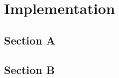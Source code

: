\chapter{Implementation}\label{ch:implementation} %
\lipsum[1]

\section{Section A}
\lipsum[4-8]

\section{Section B}
\lipsum[8-16]